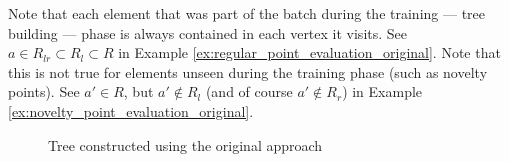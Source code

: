Note that each element that was part of the batch during the training --- tree building --- phase is always contained in each vertex it visits. See $a \in R_{lr} \subset R_{l} \subset R$ in Example \ref{ex:regular_point_evaluation_original}.
Note that this is not true for elements unseen during the training phase (such as novelty points).
See $a' \in R$, but $a' \notin R_l$ (and of course $a' \notin R_r$) in Example \ref{ex:novelty_point_evaluation_original}.

\begin{figure}[htbp]
\centering

\caption{Tree constructed using the original approach}
\label{fig:example_noutlier_tree_color}
\end{figure}
